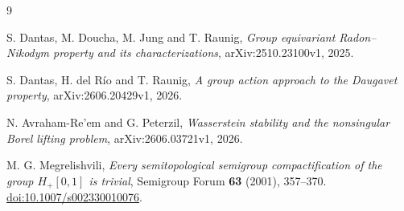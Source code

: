 \documentclass[11pt]{article}
\theoremstyle{remark}
\begin{document}
\begin{thebibliography}{9}

S. Dantas, M. Doucha, M. Jung and T. Raunig,
\emph{Group equivariant Radon--Nikodym property and its characterizations},
arXiv:2510.23100v1, 2025.

S. Dantas, H. del R\'io and T. Raunig,
\emph{A group action approach to the Daugavet property},
arXiv:2606.20429v1, 2026.

N. Avraham-Re'em and G. Peterzil,
\emph{Wasserstein stability and the nonsingular Borel lifting problem},
arXiv:2606.03721v1, 2026.

M. G. Megrelishvili,
\emph{Every semitopological semigroup compactification of the group
$H_+[0,1]$ is trivial},
Semigroup Forum \textbf{63} (2001), 357--370.
\href{https://doi.org/10.1007/s002330010076}{doi:10.1007/s002330010076}.

\end{thebibliography}
\end{document}
